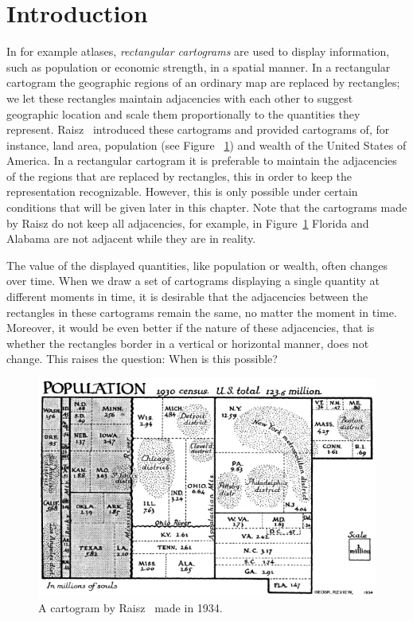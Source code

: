 
\section{Introduction}
\thispagestyle{plain}


  In for example atlases, \emph{rectangular cartograms} are used to display information, such as population or economic strength, in a spatial manner.
  In a rectangular cartogram  the geographic regions of an ordinary map are replaced by rectangles; we let these rectangles maintain adjacencies with each other to suggest geographic location and scale them proportionally to the quantities they represent.
  Raisz~\cite{Raisz1934} introduced these cartograms and provided cartograms of, for instance, land area, population (see Figure~ \ref{fig:intro:raisz}) and wealth of the United States of America.
  In a rectangular cartogram it is preferable to maintain the adjacencies of the regions that are replaced by rectangles, this in order to keep the representation recognizable.
  However, this is only possible under certain conditions that will be given later in this chapter.
  Note that the cartograms made by Raisz do not keep all adjacencies, for example, in Figure~\ref{fig:intro:raisz} Florida and Alabama are not adjacent while they are in reality.

  The value of the displayed quantities, like population or wealth, often changes over time.
  When we draw a set of cartograms displaying a single quantity at different moments in time, it is desirable that the adjacencies between the rectangles in these cartograms remain the same, no matter the moment in time.
  Moreover, it would be even better if the nature of these adjacencies, that is whether the rectangles border in a vertical or horizontal manner, does not change.
  This raises the question: When is this possible?

  \begin{figure}[!b]
    \centering
    \includegraphics[scale=.8]{introduction/img/cartogram.png}
    \caption{A cartogram by Raisz~\cite{Raisz1934} made in 1934.}
    \label{fig:intro:raisz}
  \end{figure}

